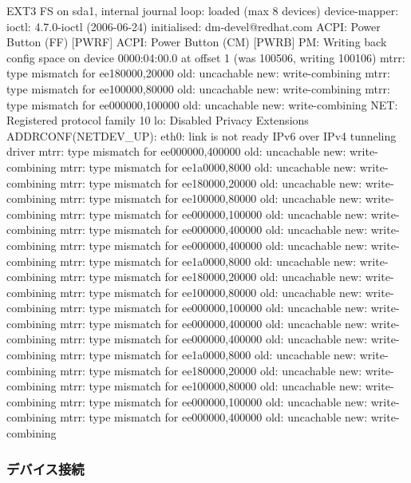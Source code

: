 \documentclass[mingoth,a4paper]{jsarticle}
\begin{document}
\begin{commandline}
EXT3 FS on sda1, internal journal
loop: loaded (max 8 devices)
device-mapper: ioctl: 4.7.0-ioctl (2006-06-24) initialised: dm-devel@redhat.com
ACPI: Power Button (FF) [PWRF]
ACPI: Power Button (CM) [PWRB]
PM: Writing back config space on device 0000:04:00.0 at offset 1 (was 100506, writing 100106)
mtrr: type mismatch for ee180000,20000 old: uncachable new: write-combining
mtrr: type mismatch for ee100000,80000 old: uncachable new: write-combining
mtrr: type mismatch for ee000000,100000 old: uncachable new: write-combining
NET: Registered protocol family 10
lo: Disabled Privacy Extensions
ADDRCONF(NETDEV_UP): eth0: link is not ready
IPv6 over IPv4 tunneling driver
mtrr: type mismatch for ee000000,400000 old: uncachable new: write-combining
mtrr: type mismatch for ee1a0000,8000 old: uncachable new: write-combining
mtrr: type mismatch for ee180000,20000 old: uncachable new: write-combining
mtrr: type mismatch for ee100000,80000 old: uncachable new: write-combining
mtrr: type mismatch for ee000000,100000 old: uncachable new: write-combining
mtrr: type mismatch for ee000000,400000 old: uncachable new: write-combining
mtrr: type mismatch for ee000000,400000 old: uncachable new: write-combining
mtrr: type mismatch for ee1a0000,8000 old: uncachable new: write-combining
mtrr: type mismatch for ee180000,20000 old: uncachable new: write-combining
mtrr: type mismatch for ee100000,80000 old: uncachable new: write-combining
mtrr: type mismatch for ee000000,100000 old: uncachable new: write-combining
mtrr: type mismatch for ee000000,400000 old: uncachable new: write-combining
mtrr: type mismatch for ee000000,400000 old: uncachable new: write-combining
mtrr: type mismatch for ee1a0000,8000 old: uncachable new: write-combining
mtrr: type mismatch for ee180000,20000 old: uncachable new: write-combining
mtrr: type mismatch for ee100000,80000 old: uncachable new: write-combining
mtrr: type mismatch for ee000000,100000 old: uncachable new: write-combining
mtrr: type mismatch for ee000000,400000 old: uncachable new: write-combining

\end{commandline}
\subsubsection{デバイス接続}
\end{document}
